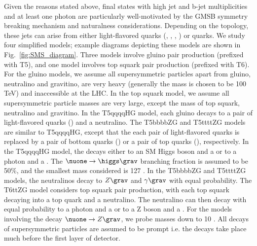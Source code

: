 Given the reasons stated above, final states with high jet and b-jet multiplicities and at least one photon
are particularly well-motivated by the GMSB symmetry breaking mechanism and naturalness considerations.
Depending on the topology, these jets can arise from either light-flavored quarks (\cPqu, \cPqd, \cPqs, \cPqc) or {\cPqb} quarks. We study four simplified models; example diagrams depicting these models are shown in Fig.~\ref{fig:SMS_diagram}.
Three models involve gluino pair production (prefixed with T5), and one model involves top squark pair production (prefixed with T6).
For the gluino models, we assume all supersymmetric particles apart from gluino, neutralino and gravitino, are very heavy (generally the 
mass is chosen to be 100 TeV) and inaccessible at the LHC. In the top squark model, we assume all supersymmetric particle masses
are very large, except the mass of top squark, neutralino and gravitino.
In the T5qqqqHG model, each gluino decays to a pair of light-flavored quarks (\qqbar) and a neutralino.  The T5bbbbZG and T5ttttZG models are similar to T5qqqqHG, except that the each pair of light-flavored quarks is replaced by a pair of bottom quarks (\bbbar) or a pair of top quarks (\ttbar), respectively. In the T5qqqqHG model, the \nuone decays either to an SM Higgs boson and a \grav or to a photon and a .  The $\nuone\to\higgs\grav$ branching fraction is assumed to be 50\%, and the smallest \nuone mass considered is 127 \gev. In the T5bbbbZG and T5ttttZG models, the neutralinos decay to $Z\grav$ and $\gamma\grav$ with equal probability. The T6ttZG model considers top squark pair production, with each top squark decaying into a top quark and a neutralino. The neutralino can then decay with equal probability to a photon and a \grav or to a Z boson and a \grav. For the models involving the decay $\nuone\to Z\grav$, we probe \nuone masses down to 10 \gev. All decays of supersymmetric particles are assumed to be prompt i.e. the decays take place much before the first layer of detector. 

